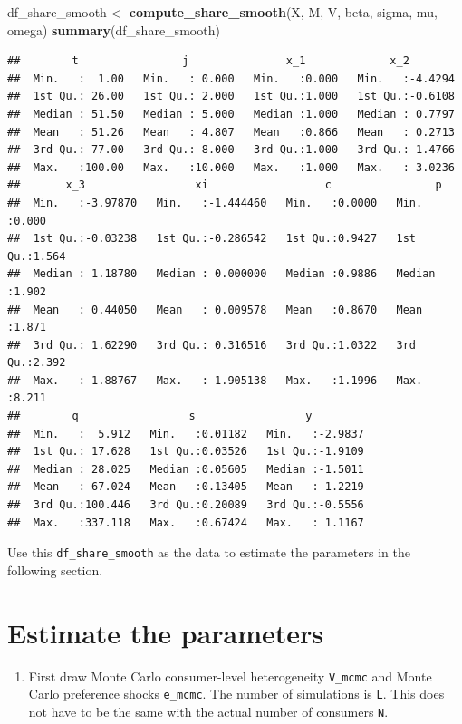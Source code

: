 \documentclass[]{book}
\newenvironment{Shaded}{\begin{snugshade}}{\end{snugshade}}
\newcommand{\KeywordTok}[1]{\textcolor[rgb]{0.13,0.29,0.53}{\textbf{#1}}}
\newcommand{\StringTok}[1]{\textcolor[rgb]{0.31,0.60,0.02}{#1}}
\newcommand{\NormalTok}[1]{#1}
\providecommand{\tightlist}{%
  \setlength{\itemsep}{0pt}\setlength{\parskip}{0pt}}
\begin{document}
\begin{Shaded}
\begin{Highlighting}[]
\NormalTok{df_share_smooth <-}\StringTok{ }\KeywordTok{compute_share_smooth}\NormalTok{(X, M, V, beta, sigma, mu, omega)}
\KeywordTok{summary}\NormalTok{(df_share_smooth)}
\end{Highlighting}
\end{Shaded}

\begin{verbatim}
##        t                j               x_1             x_2         
##  Min.   :  1.00   Min.   : 0.000   Min.   :0.000   Min.   :-4.4294  
##  1st Qu.: 26.00   1st Qu.: 2.000   1st Qu.:1.000   1st Qu.:-0.6108  
##  Median : 51.50   Median : 5.000   Median :1.000   Median : 0.7797  
##  Mean   : 51.26   Mean   : 4.807   Mean   :0.866   Mean   : 0.2713  
##  3rd Qu.: 77.00   3rd Qu.: 8.000   3rd Qu.:1.000   3rd Qu.: 1.4766  
##  Max.   :100.00   Max.   :10.000   Max.   :1.000   Max.   : 3.0236  
##       x_3                 xi                  c                p        
##  Min.   :-3.97870   Min.   :-1.444460   Min.   :0.0000   Min.   :0.000  
##  1st Qu.:-0.03238   1st Qu.:-0.286542   1st Qu.:0.9427   1st Qu.:1.564  
##  Median : 1.18780   Median : 0.000000   Median :0.9886   Median :1.902  
##  Mean   : 0.44050   Mean   : 0.009578   Mean   :0.8670   Mean   :1.871  
##  3rd Qu.: 1.62290   3rd Qu.: 0.316516   3rd Qu.:1.0322   3rd Qu.:2.392  
##  Max.   : 1.88767   Max.   : 1.905138   Max.   :1.1996   Max.   :8.211  
##        q                 s                 y          
##  Min.   :  5.912   Min.   :0.01182   Min.   :-2.9837  
##  1st Qu.: 17.628   1st Qu.:0.03526   1st Qu.:-1.9109  
##  Median : 28.025   Median :0.05605   Median :-1.5011  
##  Mean   : 67.024   Mean   :0.13405   Mean   :-1.2219  
##  3rd Qu.:100.446   3rd Qu.:0.20089   3rd Qu.:-0.5556  
##  Max.   :337.118   Max.   :0.67424   Max.   : 1.1167
\end{verbatim}

Use this \texttt{df\_share\_smooth} as the data to estimate the
parameters in the following section.

\section{Estimate the parameters}\label{estimate-the-parameters-2}

\begin{enumerate}
\def\labelenumi{\arabic{enumi}.}
\tightlist
\item
  First draw Monte Carlo consumer-level heterogeneity \texttt{V\_mcmc}
  and Monte Carlo preference shocks \texttt{e\_mcmc}. The number of
  simulations is \texttt{L}. This does not have to be the same with the
  actual number of consumers \texttt{N}.
\end{enumerate}
\end{document}
